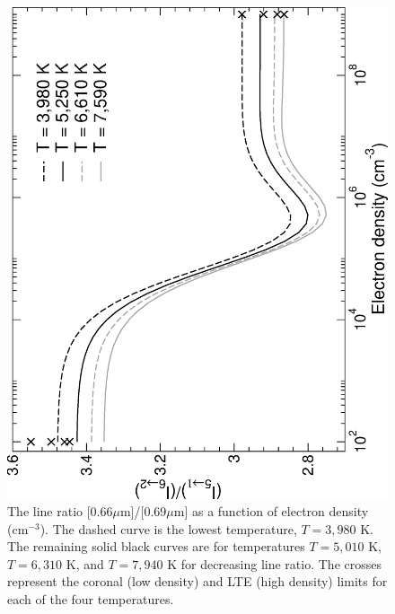 %
\begin{figure}[h]
\includegraphics[scale=0.54, angle=-90]{Figures/Cobalt/modelling/5-1over6-2/const_temp.eps}
\caption{The line ratio [0.66$\mu$m]/[0.69$\mu$m] as a function of electron density (cm$^{-3}$). The dashed curve is the lowest temperature, $T = 3,980$ K. The remaining solid black curves are for temperatures $T = 5,010$ K, $T = 6,310$ K, and $T = 7,940$ K for decreasing line ratio. The crosses represent the coronal (low density) and LTE (high density) limits for each of the four temperatures. \label{fig:co_consttemp}}
\end{figure}
%


